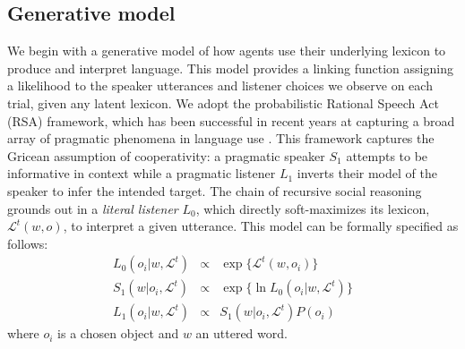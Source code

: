 \subsection{Generative model}

We begin with a generative model of how agents use their underlying lexicon to produce and interpret language. This model provides a linking function assigning a likelihood to the speaker utterances and listener choices we observe on each trial, given any latent lexicon. We adopt the probabilistic Rational Speech Act (RSA) framework, which has been successful in recent years at capturing a broad array of pragmatic phenomena in language use \cite{GoodmanFrank16_RSATiCS,FrankeJager16_ProbabilisticPragmatics}. This framework captures the Gricean assumption of cooperativity: a pragmatic speaker $S_1$ attempts to be informative in context while a pragmatic listener $L_1$ inverts their model of the speaker to infer the intended target. The chain of recursive social reasoning grounds out in a \emph{literal listener} $L_0$, which directly soft-maximizes its lexicon, $\mathcal{L}^t(w,o)$, to interpret a given utterance. This model can be formally specified as follows:
$$
\begin{array}{rcl}
L_0(o_i | w, \mathcal{L}^t) &\propto  & \exp\{\mathcal{L}^t(w,o_i)\} \\
S_1(w | o_i, \mathcal{L}^t) &\propto & \exp\{\ln L_0(o_i | w, \mathcal{L}^t)\} \\
L_1(o_i | w, \mathcal{L}^t) &\propto  & S_1(w | o_i, \mathcal{L}^t) P(o_i) 
\end{array}
$$
where $o_i$ is a chosen object and $w$ an uttered word.

